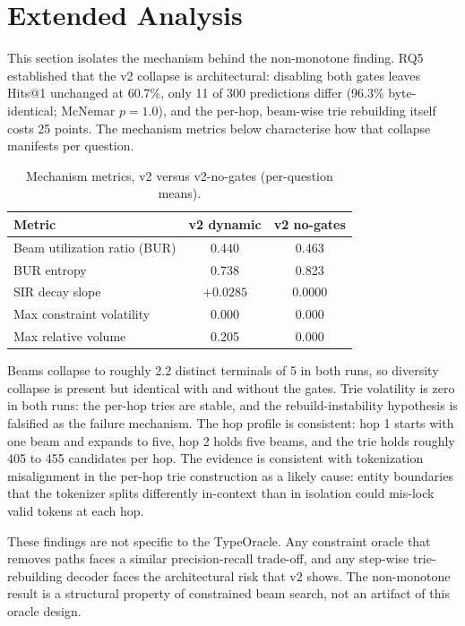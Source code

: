 
\section{Extended Analysis}
\label{sec:analysis}

This section isolates the mechanism behind the non-monotone finding. RQ5 established
that the v2 collapse is architectural: disabling both gates leaves Hits@1 unchanged at
60.7\%, only 11 of 300 predictions differ (96.3\% byte-identical; McNemar $p = 1.0$),
and the per-hop, beam-wise trie rebuilding itself costs 25 points. The mechanism
metrics below characterise how that collapse manifests per question.

\begin{table}[htpb]
  \centering
  \caption{Mechanism metrics, v2 versus v2-no-gates (per-question means).}
  \label{tab:mechanism}
  \begin{tabular}{@{}lcc@{}}
    \toprule
    Metric & v2 dynamic & v2 no-gates \\
    \midrule
    Beam utilization ratio (BUR) & 0.440 & 0.463 \\
    BUR entropy                  & 0.738 & 0.823 \\
    SIR decay slope              & $+0.0285$ & 0.0000 \\
    Max constraint volatility    & 0.000 & 0.000 \\
    Max relative volume          & 0.205 & 0.000 \\
    \bottomrule
  \end{tabular}
\end{table}

Beams collapse to roughly 2.2 distinct terminals of 5 in both runs, so diversity
collapse is present but identical with and without the gates. Trie volatility is zero in
both runs: the per-hop tries are stable, and the rebuild-instability hypothesis is
falsified as the failure mechanism. The hop profile is consistent: hop 1 starts with one
beam and expands to five, hop 2 holds five beams, and the trie holds roughly 405 to 455
candidates per hop. The evidence is consistent with tokenization misalignment in the
per-hop trie construction as a likely cause: entity boundaries that the tokenizer splits
differently in-context than in isolation could mis-lock valid tokens at each hop.

These findings are not specific to the TypeOracle. Any constraint oracle that removes
paths faces a similar precision-recall trade-off, and any step-wise trie-rebuilding
decoder faces the architectural risk that v2 shows. The non-monotone result is a
structural property of constrained beam search, not an artifact of this oracle design.